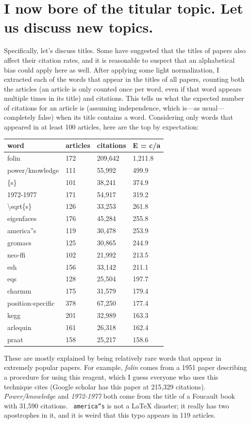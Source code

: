 \documentclass[twocolumn]{article}
\begin{document}
\section{I now bore of the titular topic. Let us discuss new topics.}

Specifically, let's discuss titles. Some have suggested that the
titles of papers also affect their citation rates, and it is
reasonable to suspect that an alphabetical bias could apply here as
well. After applying some light normalization, I extracted each of the
words that appear in the titles of all papers, counting both the
articles (an article is only counted once per word, even if that word
appears multiple times in its title) and citations. This tells us
what the expected number of citations for an article is (assuming
independence, which is---as usual---completely false) when its
title contains a word. Considering only words that appeared in
at least 100 articles, here are the top by expectation:

\begin{tabular}{l|l|l|l}
{\bf word} & {\bf articles} & {\bf citations} & {\bf E = c/a} \\
  \hline
folin & 172 & 209,642 & 1,211.8 \\
power/knowledge & 111 & 55,992 & 499.9 \\
\{s\} & 101 & 38,241 & 374.9 \\
1972-1977 & 171 & 54,917 & 319.2 \\
\textbackslash sqrt\{s\} & 126 & 33,253 & 261.8 \\
eigenfaces & 176 & 45,284 & 255.8 \\
america''s & 119 & 30,478 & 253.9 \\
gromacs & 125 & 30,865 & 244.9 \\
neo-ffi & 102 & 21,992 & 213.5 \\
esh & 156 & 33,142 & 211.1 \\
eqs & 128 & 25,504 & 197.7 \\
charmm & 175 & 31,579 & 179.4 \\
position-specific & 378 & 67,250 & 177.4 \\
kegg & 201 & 32,989 & 163.3 \\
arlequin & 161 & 26,318 & 162.4 \\
praat & 158 & 25,217 & 158.6 \\
\end{tabular}

These are mostly explained by being relatively rare words that appear
in extremely popular papers. For example, {\em folin} comes from a
1951 paper\cite{lowry1951protein} describing a procedure for using
this reagent, which I guess everyone who uses this technique cites
(Google scholar has this paper at 215,329 citations). {\em
  Power/knowledge} and {\em 1972-1977} both come from the title of a
Foucault book\cite{foucault1980power} with 31,590 citations. {\tt
  america''s} is not a LaTeX disaster; it really has two apostrophes
in it, and it is weird that this typo appears in 119 articles.
\end{document}

